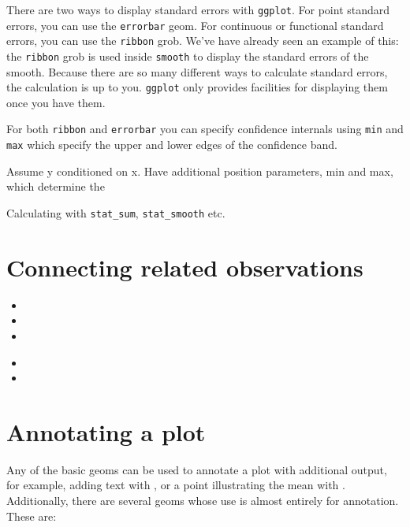 There are two ways to display standard errors with {\tt ggplot}.  For point standard errors, you can use the {\tt errorbar} geom.  For continuous or functional standard errors, you can use the {\tt ribbon} grob.  We've have already seen an example of this: the {\tt ribbon} grob is used inside {\tt smooth} to display the standard errors of the smooth.  Because there are so many different ways to calculate standard errors, the calculation is up to you.  {\tt ggplot} only provides facilities for displaying them once you have them.

For both {\tt ribbon} and {\tt errorbar} you can specify confidence internals using {\tt min} and {\tt max} which specify the upper and lower edges of the confidence band.

Assume y conditioned on x.  Have additional position parameters, min and max, which determine the 


Calculating with {\tt stat\_sum}, {\tt stat\_smooth} etc.

\section{Connecting related observations}
\label{sec:connecting}

\begin{itemize}
  \item {}
  \item {}
  \item {}
\end{itemize}

\begin{itemize}
  \item {}
  \item {}
\end{itemize}


\section{Annotating a plot}
\label{sec:annotating}

Any of the basic geoms can be used to annotate a plot with additional output, for example, adding text with , or a point illustrating the mean with .  Additionally, there are several geoms whose use is almost entirely for annotation.  These are:

